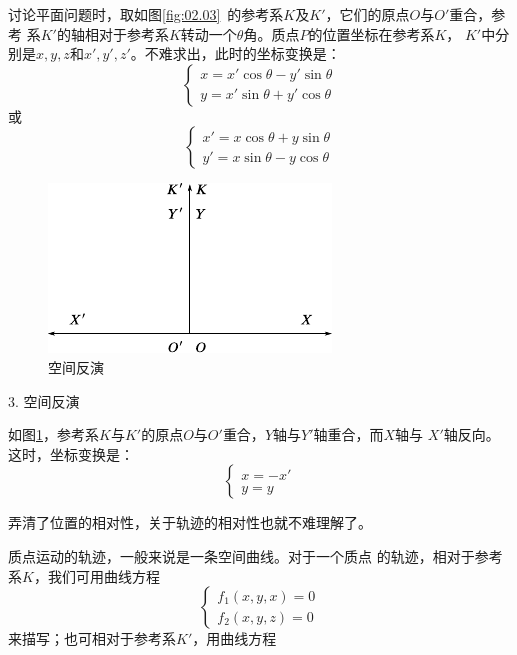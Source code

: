 讨论平面问题时，取如图\ref{fig:02.03}~的参考系$K$及$K'$，它们的原点$O$与$O'$重合，参考
系$K'$的轴相对于参考系$ K $转动一个$\theta$角。质点$P$的位置坐标在参考系$K$，
$K'$中分别是$x,y,z$和$x',y',z'$。不难求出，此时的坐标变换是：\vspace{-0.2em}
\begin{equation}\label{eqn:02.02.04}
  \left\{\begin{array}{l}
    x=x'\cos\theta-y'\sin\theta \\
    y=x'\sin\theta+y'\cos\theta
  \end{array}\right.
\end{equation}
或\vspace{-1em}
\begin{equation*}
  \left\{\begin{array}{l}
    x'=x\cos\theta+y\sin\theta \\
    y'=x\sin\theta-y\cos\theta
  \end{array}\right.
\end{equation*}

\begin{figure}
  \centering
  \includegraphics{figure/fig02.04}
  \caption{空间反演}
  \label{fig:02.04}
\end{figure}
\textsf{3. 空间反演}

如图\ref{fig:02.04}，参考系$K$与$K'$的原点$O$与$O'$重合，$Y$轴与$Y'$轴重合，而$X$轴与
$X'$轴反向。这时，坐标变换是：\vspace{-0.5em}
{\setlength{\mathindent}{2em}
  \begin{equation}\label{eqn:02.02.05}
    \left\{\begin{array}{l}
      x=-x' \\
      y=y
    \end{array}\right.
  \end{equation}}%

弄清了位置的相对性，关于轨迹的相对性也就不难理解了。

质点运动的轨迹，一般来说是一条空间曲线。对于一个质点
的轨迹，相对于参考系$ K $，我们可用曲线方程
\begin{equation}\label{eqn:02.02.06}
  \left\{\begin{array}{l}
    f_1\left(x,y,x\right)=0 \\
    f_2\left(x,y,z\right)=0
  \end{array}\right.
\end{equation}
来描写；也可相对于参考系$K'$，用曲线方程

